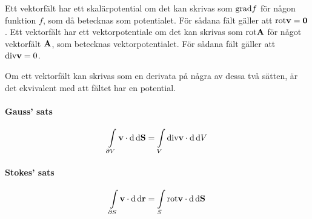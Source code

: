Ett vektorfält har ett skalärpotential om det kan skrivas som $\text{grad}f$ för någon funktion $f$, som då betecknas som potentialet. För sådana fält gäller att $\text{rot}\vb{v} = \vb{0}$. Ett vektorfält har ett vektorpotentiale om det kan skrivas som $\text{rot}\vb{A}$ för något vektorfält $\vb{A}$, som betecknas vektorpotentialet. För sådana fält gäller att $\text{div}\vb{v} = 0$.

Om ett vektorfält kan skrivas som en derivata på några av dessa två sätten, är det ekvivalent med att fältet har en potential.

\paragraph{Gauss' sats}
\begin{align*}
	\int\limits_{\partial V}\vb{v}\cdot\dd{\dd{\vb{S}}} = \int\limits_{V}\text{div}\vb{v}\cdot\dd{\dd{V}}
\end{align*}

\paragraph{Stokes' sats}
\begin{align*}
	\int\limits_{\partial S}\vb{v}\cdot\dd{\dd{\vb{r}}} = \int\limits_{S}\text{rot}\vb{v}\cdot\dd{\dd{\vb{S}}}
\end{align*}